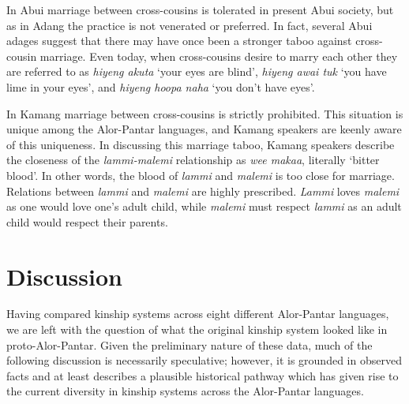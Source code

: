 In Abui marriage between cross-cousins is tolerated in present Abui society, but as in Adang the practice is not venerated or preferred. In fact, several Abui adages suggest that there may have once been a stronger taboo against cross-cousin marriage. Even today, when cross-cousins desire to marry each other they are referred to as \textit{hiyeng akuta} `your eyes are blind', \textit{hiyeng awai tuk} `you have lime in your eyes', and \textit{hiyeng hoopa naha} `you don't have eyes'.

In Kamang marriage between cross-cousins is strictly prohibited. This situation is unique among the Alor-Pantar languages, and Kamang speakers are keenly aware of this uniqueness. In discussing this marriage taboo, Kamang speakers describe the closeness of the \textit{lammi-malemi} relationship as \textit{wee makaa}, literally `bitter blood'. In other words, the blood of \textit{lammi} and \textit{malemi} is too close for marriage. Relations between \textit{lammi} and \textit{malemi} are highly prescribed. \textit{Lammi} loves \textit{malemi} as one would love one's adult child, while \textit{malemi} must respect \textit{lammi} as an adult child would respect their parents.

\section{Discussion}
Having compared kinship systems across eight different Alor-Pantar languages, we are left with the question of what the original kinship system looked like in proto-Alor-Pantar. Given the preliminary nature of these data, much of the following discussion is necessarily speculative; however, it is grounded in observed facts and at least describes a plausible historical pathway which has given rise to the current diversity in kinship systems across the Alor-Pantar languages.

